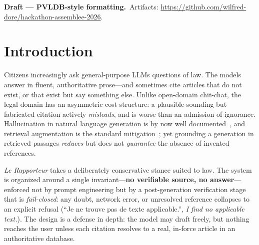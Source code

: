 \documentclass[sigconf, nonacm]{acmart}
\begin{document}
\begingroup\small\noindent\raggedright
\textbf{Draft --- PVLDB-style formatting.}\
Artifacts: \url{https://github.com/wilfred-dore/hackathon-assemblee-2026}.
\endgroup

\section{Introduction}
Citizens increasingly ask general-purpose LLMs questions of law. The models
answer in fluent, authoritative prose---and sometimes cite articles that do
not exist, or that exist but say something else. Unlike open-domain chit-chat,
the legal domain has an asymmetric cost structure: a plausible-sounding but
fabricated citation actively \emph{misleads}, and is worse than an admission
of ignorance. Hallucination in natural language generation is by now
well documented~\cite{ji2023hallucination}, and retrieval augmentation is the
standard mitigation~\cite{lewis2020rag}; yet grounding a generation in
retrieved passages \emph{reduces} but does not \emph{guarantee} the absence of
invented references.

\emph{Le Rapporteur} takes a deliberately conservative stance suited to law.
The system is organized around a single invariant---\textbf{no verifiable
source, no answer}---enforced not by prompt engineering but by a
post-generation verification stage that is \emph{fail-closed}: any doubt,
network error, or unresolved reference collapses to an explicit refusal
(``Je ne trouve pas de texte applicable.'', \emph{I find no applicable
text.}). The design is a defense in depth: the model may draft freely, but
nothing reaches the user unless each citation resolves to a real, in-force
article in an authoritative database.
\end{document}
